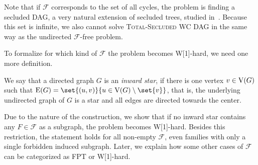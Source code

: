 
Note that if $\mathcal{F}$ corresponds to the set of all cycles, the problem is finding a secluded DAG, a very natural extension of secluded trees, studied in~\cite{golovach2020finding,donkers2023finding}. Because this set is infinite, we also cannot solve \textsc{Total-Secluded WC DAG} in the same way as the undirected $\mathcal{F}$-free problem. 

To formalize for which kind of $\mathcal{F}$ the problem becomes W[1]-hard, we need one more definition.
\begin{definition}
  We say that a directed graph $G$ is an \emph{inward star}, if there is one vertex $v \in \operatorname{V}({G})$ such that $\e{G} = \set{\died{u}{v}}{u \in \ve{G} \setminus \set{v}}$, that is, the underlying undirected graph of $G$ is a star and all edges are directed towards the center.
\end{definition}

Due to the nature of the construction, we show that if no inward star contains any $F \in \mathcal{F}$ as a subgraph, the problem becomes W[1]-hard. Besides this restriction, the statement holds for all non-empty $\mathcal{F}$, even families with only a single forbidden induced subgraph. Later, we explain how some other cases of $\mathcal{F}$ can be categorized as FPT or W[1]-hard.

